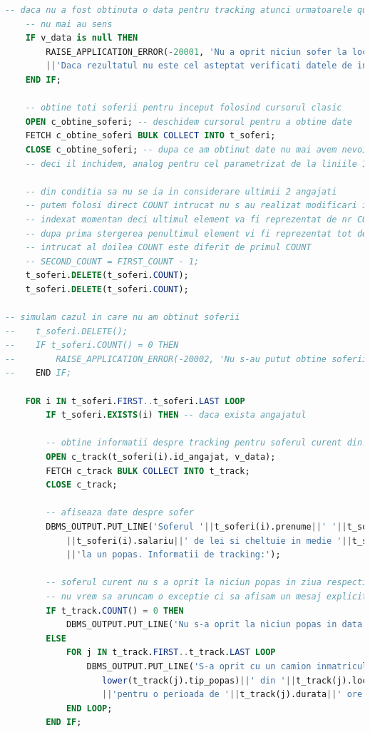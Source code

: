 \documentclass[12pt, a4paper]{article}
\begin{document}
\begin{lstlisting}[language=SQL]
    -- daca nu a fost obtinuta o data pentru tracking atunci urmatoarele queries
    -- nu mai au sens
    IF v_data is null THEN
        RAISE_APPLICATION_ERROR(-20001, 'Nu a oprit niciun sofer la locatia data. '
        ||'Daca rezultatul nu este cel asteptat verificati datele de intrare.');
    END IF;
       
    -- obtine toti soferii pentru inceput folosind cursorul clasic
    OPEN c_obtine_soferi; -- deschidem cursorul pentru a obtine date
    FETCH c_obtine_soferi BULK COLLECT INTO t_soferi;
    CLOSE c_obtine_soferi; -- dupa ce am obtinut date nu mai avem nevoie de cursor 
	-- deci il inchidem, analog pentru cel parametrizat de la liniile 137-139
    
    -- din conditia sa nu se ia in considerare ultimii 2 angajati
    -- putem folosi direct COUNT intrucat nu s au realizat modificari in tabloul
    -- indexat momentan deci ultimul element va fi reprezentat de nr COUNT
    -- dupa prima stergerea penultimul element vi fi reprezentat tot de nr COUNT
    -- intrucat al doilea COUNT este diferit de primul COUNT
    -- SECOND_COUNT = FIRST_COUNT - 1;
    t_soferi.DELETE(t_soferi.COUNT);
    t_soferi.DELETE(t_soferi.COUNT);

-- simulam cazul in care nu am obtinut soferii
--    t_soferi.DELETE();
--    IF t_soferi.COUNT() = 0 THEN
--        RAISE_APPLICATION_ERROR(-20002, 'Nu s-au putut obtine soferii');
--    END IF;

    FOR i IN t_soferi.FIRST..t_soferi.LAST LOOP
        IF t_soferi.EXISTS(i) THEN -- daca exista angajatul
        
        -- obtine informatii despre tracking pentru soferul curent din loop
        OPEN c_track(t_soferi(i).id_angajat, v_data);
        FETCH c_track BULK COLLECT INTO t_track;
        CLOSE c_track;
        
        -- afiseaza date despre sofer
        DBMS_OUTPUT.PUT_LINE('Soferul '||t_soferi(i).prenume||' '||t_soferi(i).nume||' are salariul de '
            ||t_soferi(i).salariu||' de lei si cheltuie in medie '||t_soferi(i).bani_cheltuiti||' lei '
            ||'la un popas. Informatii de tracking:');
         
        -- soferul curent nu s a oprit la niciun popas in ziua respectiva
        -- nu vrem sa aruncam o exceptie ci sa afisam un mesaj explicit pentru acest caz special
        IF t_track.COUNT() = 0 THEN
            DBMS_OUTPUT.PUT_LINE('Nu s-a oprit la niciun popas in data de '||v_data);
        ELSE
            FOR j IN t_track.FIRST..t_track.LAST LOOP
                DBMS_OUTPUT.PUT_LINE('S-a oprit cu un camion inmatriculat '||t_track(j).din_ph||' la un '||
                   lower(t_track(j).tip_popas)||' din '||t_track(j).locatie_popas||' la ora '||t_track(j).ora_sosire||' unde a stat '
                   ||'pentru o perioada de '||t_track(j).durata||' ore.');
            END LOOP;
        END IF;
       

\end{lstlisting}
\end{document}
